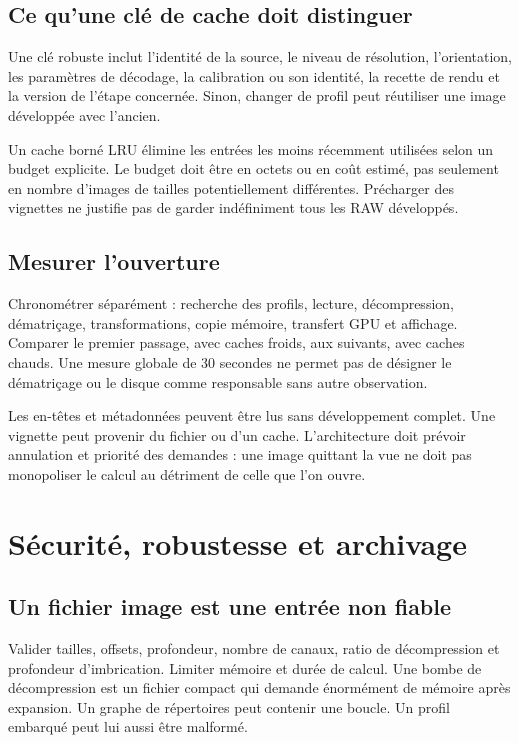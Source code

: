 \subsection{Ce qu'une clé de cache doit distinguer}
Une clé robuste inclut l'identité de la source,
le niveau de résolution, l'orientation, les
paramètres de décodage, la calibration ou son
identité, la recette de rendu et la version
de l'étape concernée. Sinon, changer de profil
peut réutiliser une image développée avec l'ancien.

Un cache borné LRU élimine les entrées les moins
récemment utilisées selon un budget explicite.
Le budget doit être en octets ou en coût estimé,
pas seulement en nombre d'images de tailles
potentiellement différentes. Précharger des
vignettes ne justifie pas de garder indéfiniment
tous les RAW développés.

\subsection{Mesurer l'ouverture}
Chronométrer séparément : recherche des profils,
lecture, décompression, dématriçage, transformations,
copie mémoire, transfert GPU et affichage. Comparer
le premier passage, avec caches froids, aux suivants,
avec caches chauds. Une mesure globale de 30 secondes
ne permet pas de désigner le dématriçage ou le disque
comme responsable sans autre observation.

Les en-têtes et métadonnées peuvent être lus sans
développement complet. Une vignette peut provenir
du fichier ou d'un cache. L'architecture doit
prévoir annulation et priorité des demandes :
une image quittant la vue ne doit pas monopoliser
le calcul au détriment de celle que l'on ouvre.

\section{Sécurité, robustesse et archivage}
\subsection{Un fichier image est une entrée non fiable}
Valider tailles, offsets, profondeur, nombre de
canaux, ratio de décompression et profondeur
d'imbrication. Limiter mémoire et durée de calcul.
Une bombe de décompression est un fichier compact
qui demande énormément de mémoire après expansion.
Un graphe de répertoires peut contenir une boucle.
Un profil embarqué peut lui aussi être malformé.

